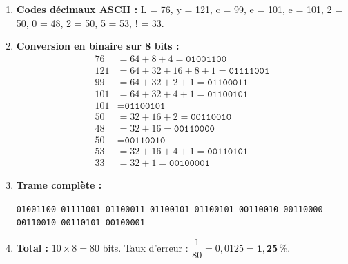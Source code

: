\documentclass[11pt]{article}
\begin{document}
\begin{corrige}[Exercice 2]
\begin{enumerate}
    \item \textbf{Codes décimaux ASCII :} L = 76, y = 121, c = 99, e = 101, e = 101, 2 = 50, 0 = 48, 2 = 50, 5 = 53, ! = 33.
    \item \textbf{Conversion en binaire sur 8 bits :}
    \begin{align*}
        76  &= 64+8+4 = \texttt{01001100} \\
        121 &= 64+32+16+8+1 = \texttt{01111001} \\
        99  &= 64+32+2+1 = \texttt{01100011} \\
        101 &= 64+32+4+1 = \texttt{01100101} \\
        101 &= \texttt{01100101} \\
        50  &= 32+16+2 = \texttt{00110010} \\
        48  &= 32+16 = \texttt{00110000} \\
        50  &= \texttt{00110010} \\
        53  &= 32+16+4+1 = \texttt{00110101} \\
        33  &= 32+1 = \texttt{00100001}
    \end{align*}
    \item \textbf{Trame complète :}

    \texttt{01001100 01111001 01100011 01100101 01100101 00110010 00110000 00110010 00110101 00100001}
    \item \textbf{Total :} $10 \times 8 = 80$ bits. Taux d'erreur : $\dfrac{1}{80} = 0{,}0125 = \mathbf{1{,}25\,\%}$.
\end{enumerate}
\end{corrige}
\end{document}

